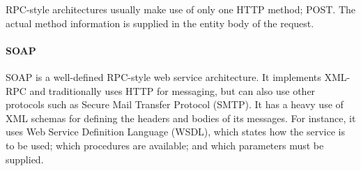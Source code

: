 RPC-style architectures usually make use of only one HTTP method; POST.
The actual method information is supplied in the entity body of the request.


\paragraph{SOAP}
SOAP is a well-defined RPC-style web service architecture.
It implements XML-RPC and traditionally uses HTTP for messaging, but can also use other protocols such as Secure Mail Transfer Protocol (SMTP).
It has a heavy use of XML schemas for defining the headers and bodies of its messages.
For instance, it uses Web Service Definition Language (WSDL), which states how the service is to be used; which procedures are available; and which parameters must be supplied.





